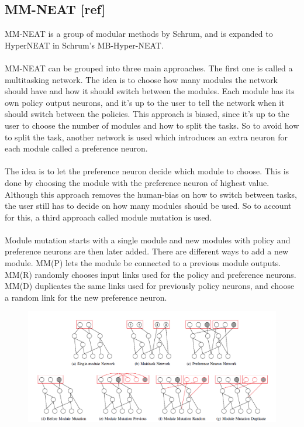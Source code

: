\documentclass[11pt, a4paper]{article}
\begin{document}
\subsection{MM-NEAT [ref]}
MM-NEAT is a group of modular methods by Schrum, and is expanded to HyperNEAT in Schrum's MB-Hyper-NEAT.
\\ 
\\
MM-NEAT can be grouped into three main approaches. The first one is called a multitasking network. The idea is to choose how many modules the network should have and how it should switch between the modules. Each module has its own policy output neurons, and it’s up to the user to tell the network when it should switch between the policies. This approach is biased, since it’s up to the user to choose the number of modules and how to split the tasks. So to avoid how to split the task, another network is used which introduces an extra neuron for each module called a preference neuron. 
\\ 
\\
The idea is to let the preference neuron decide which module to choose. This is done by choosing the module with the preference neuron of highest value. Although this approach removes the human-bias on how to switch between tasks, the user still has to decide on how many modules should be used. So to account for this, a third approach called module mutation is used.
\\ 
\\
Module mutation starts with a single module and new modules with policy and preference neurons are then later added. There are different ways to add a new module. MM(P) lets the module be connected to a previous module outputs. MM(R) randomly chooses input links used for the policy and preference neurons. MM(D) duplicates the same links used for previously policy neurons, and choose a random link for the new preference neuron.
\begin{figure}[!ht]
\centering
\includegraphics[scale=0.45]{MM-NEAT}
\caption{}
\end{figure}
\end{document}
